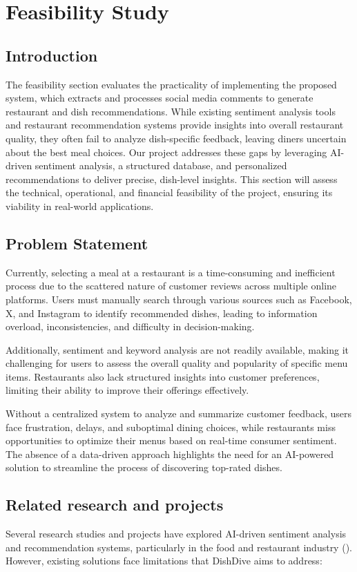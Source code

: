 \chapter{Feasibility Study}

\section{Introduction}
The feasibility section evaluates the practicality of implementing the proposed
system, which extracts and processes social media comments to generate restaurant and dish
recommendations. While existing sentiment analysis tools and restaurant recommendation
systems provide insights into overall restaurant quality, they often fail to analyze
dish-specific feedback, leaving diners uncertain about the best meal choices. Our project
addresses these gaps by leveraging AI-driven sentiment analysis, a structured database, and
personalized recommendations to deliver precise, dish-level insights. This section will assess
the technical, operational, and financial feasibility of the project, ensuring its viability in
real-world applications.

\section{Problem Statement}
Currently, selecting a meal at a restaurant is a time-consuming and inefficient process due to the scattered nature of customer reviews across multiple online platforms. Users must manually search through various sources such as Facebook, X, and Instagram to identify recommended dishes, leading to information overload, inconsistencies, and difficulty in decision-making.

Additionally, sentiment and keyword analysis are not readily available, making it challenging for users to assess the overall quality and popularity of specific menu items. Restaurants also lack structured insights into customer preferences, limiting their ability to improve their offerings effectively.

Without a centralized system to analyze and summarize customer feedback, users face frustration, delays, and suboptimal dining choices, while restaurants miss opportunities to optimize their menus based on real-time consumer sentiment. The absence of a data-driven approach highlights the need for an AI-powered solution to streamline the process of discovering top-rated dishes.

\section{Related research and projects}
Several research studies and projects have explored AI-driven sentiment analysis and recommendation systems, particularly in the food and restaurant industry (\parencite{Zahrah2024}). However, existing solutions face limitations that DishDive aims to address:


